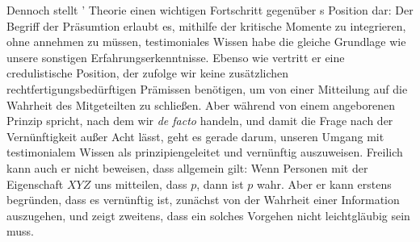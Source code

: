 Dennoch stellt
'
Theorie einen wichtigen Fortschritt gegenüber
s Position dar: Der
Begriff der Präsumtion erlaubt es, mithilfe der  kritische
Momente zu integrieren, ohne annehmen zu müssen, testimoniales Wissen habe die
gleiche Grundlage wie unsere sonstigen Erfahrungserkenntnisse. Ebenso wie
 vertritt er eine
credulistische Position, der zufolge wir keine zusätzlichen
rechtfertigungsbedürftigen Prämissen benötigen, um von einer Mitteilung auf die
Wahrheit des Mitgeteilten zu schließen. Aber während
 von einem angeborenen
Prinzip spricht, nach dem wir \emph{de facto} handeln, und damit die Frage nach
der Vernünftigkeit außer Acht lässt, geht es
gerade darum, unseren Umgang mit testimonialem Wissen als prinzipiengeleitet und
vernünftig auszuweisen. Freilich kann auch er nicht beweisen, dass allgemein
gilt: Wenn Personen mit der Eigenschaft $XYZ$ uns mitteilen, dass $p$, dann ist
$p$ wahr. Aber er kann erstens begründen, dass es vernünftig ist, zunächst von
der Wahrheit einer Information auszugehen, und zeigt zweitens, dass ein solches
Vorgehen nicht leichtgläubig sein muss.

